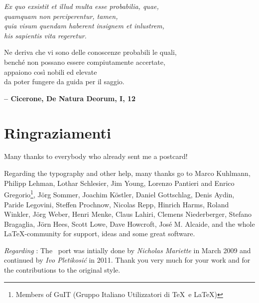 
\begin{flushright}
{
	\emph{
		Ex quo exsistit et illud multa esse probabilia, quae, \\
		quamquam non perciperentur, tamen, \\
		quia visum quendam haberent insignem et inlustrem, \\
		his sapientis vita regeretur. \\
	}

	\medskip

	Ne deriva che vi sono delle conoscenze probabili le quali, \\
	benché non possano essere compiutamente accertate, \\
	appaiono così nobili ed elevate \\
	da poter fungere da guida per il saggio. \\

	\medskip

	\textbf{-- Cicerone, De Natura Deorum, I, 12} 
}
\end{flushright}

\bigskip

\begingroup
\let\clearpage\relax
\let\cleardoublepage\relax
\let\cleardoublepage\relax
\chapter*{Ringraziamenti}

Many thanks to everybody who already sent me a postcard!

Regarding the typography and other help, many thanks go to Marco
Kuhlmann, Philipp Lehman, Lothar Schlesier, Jim Young, Lorenzo
Pantieri and Enrico Gregorio\footnote{Members of GuIT (Gruppo
Italiano Utilizzatori di \TeX\ e \LaTeX )}, J\"org Sommer,
Joachim K\"ostler, Daniel Gottschlag, Denis Aydin, Paride
Legovini, Steffen Prochnow, Nicolas Repp, Hinrich Harms,
Roland Winkler, Jörg Weber, Henri Menke, Claus Lahiri,
Clemens Niederberger, Stefano Bragaglia, Jörn Hees,
Scott Lowe, Dave Howcroft, Jos\'e M. Alcaide, 
and the whole \LaTeX-community for support, ideas and
some great software.

\bigskip

\noindent\emph{Regarding \mLyX}: The \mLyX\ port was intially done by
\emph{Nicholas Mariette} in March 2009 and continued by
\emph{Ivo Pletikosi\'c} in 2011. Thank you very much for your
work and for the contributions to the original style.


\endgroup
